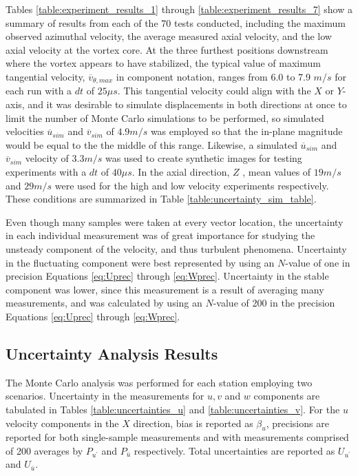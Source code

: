 Tables \ref{table:experiment_results_1} through 
\ref{table:experiment_results_7} show a summary of results from each of the 70 
tests conducted, including the maximum 
observed azimuthal velocity, the average measured axial velocity, and the low 
axial velocity at the vortex core. At the three furthest positions downstream 
where the vortex appears to have stabilized, the typical value of maximum 
tangential velocity, $\overline{v}_{\theta,max}$ in component notation, ranges 
from 6.0 to 7.9 $m/s$ for each run with a $dt$ of $25 \mu s$. This tangential 
velocity could align with the $X$ or $Y$-axis, and 
it was desirable to simulate displacements in both directions at once to limit 
the number of Monte Carlo simulations to be performed, so simulated velocities
$\overline{u}_{sim}$ and $\overline{v}_{sim}$
of $4.9 m/s$ was employed so that the in-plane magnitude would be equal 
to the the middle of this range. Likewise, a simulated $\overline{u}_{sim}$ and 
$\overline{v}_{sim}$  velocity of 
$3.3 m/s$ was used to create synthetic images for testing experiments with a 
$dt$ of $40 \mu s$. In the axial direction, $Z$ , mean values of $19 m/s$ and 
$29 
m/s$ were used for the high and low velocity experiments respectively. These 
conditions are summarized in Table \ref{table:uncertainty_sim_table}.

\vspace{32pt}


Even though many samples were taken at every vector location, the uncertainty 
in each individual measurement was of great importance for studying the 
unsteady component of the velocity, and thus turbulent phenomena. Uncertainty 
in the fluctuating component were best represented by using an $N$-value of one 
in precision Equations \ref{eq:Uprec} through \ref{eq:Wprec}. 
Uncertainty in the stable component was lower, since this measurement is a 
result of averaging many measurements, and was calculated by using an $N$-value 
of 200 in the precision Equations \ref{eq:Uprec} through \ref{eq:Wprec}.

\clearpage
\subsection{Uncertainty Analysis Results}
The Monte Carlo analysis was performed for each station employing two 
scenarios. Uncertainty in the measurements for $u, v$ and $w$ 
components are tabulated in Tables \ref{table:uncertainties_u} and 
\ref{table:uncertainties_v}. For the $u$ velocity components in the $X$ 
direction, bias is reported as $\beta_u$, 
precisions are reported for both single-sample measurements and with 
measurements comprised of 200 averages by $P_{u^\prime}$ and $P_{\bar{u}}$ 
respectively. Total uncertainties are reported as $U_{u^\prime}$ and 
$U_{\bar{u}}$. 

